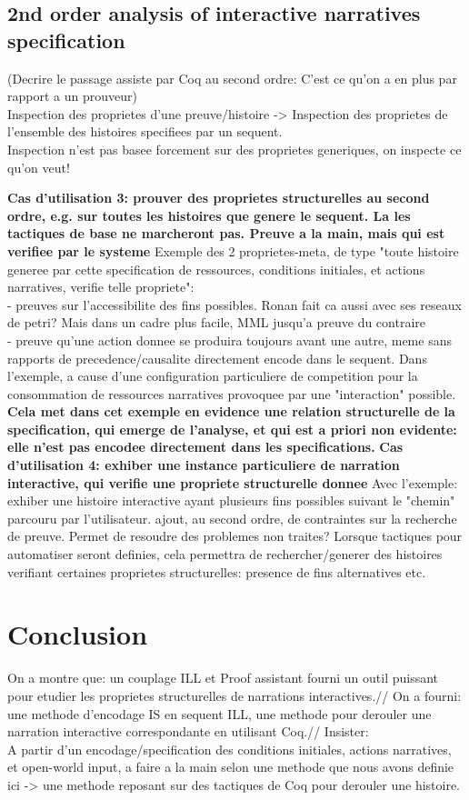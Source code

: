 \documentclass[runningheads,a4paper]{llncs}
\begin{document}
\subsection{2nd order analysis of interactive narratives specification}
(Decrire le passage assiste par Coq au second ordre: C'est ce qu'on a en plus par rapport a un prouveur)
\\
Inspection des proprietes d'une preuve/histoire -> Inspection des proprietes de l'ensemble des histoires specifiees par un sequent.\\
Inspection n'est pas basee forcement sur des proprietes generiques, on inspecte ce qu'on veut!

\textbf{Cas d'utilisation 3: prouver des proprietes structurelles au second ordre, e.g. sur toutes les histoires que genere le sequent. La les tactiques de base ne marcheront pas. Preuve a la main, mais qui est verifiee par le systeme}
Exemple des 2 proprietes-meta, de type "toute histoire generee par cette specification de ressources, conditions initiales, et actions narratives, verifie telle propriete":\\
- preuves sur l'accessibilite des fins possibles. Ronan fait ca aussi avec ses reseaux de petri? Mais dans un cadre plus facile, MML jusqu'a preuve du contraire\\
- preuve qu'une action donnee se produira toujours avant une autre, meme sans rapports de precedence/causalite directement encode dans le sequent. Dans l'exemple, a cause d'une configuration particuliere de competition pour la consommation de ressources narratives provoquee par une "interaction" possible. \textbf{Cela met dans cet exemple en evidence une relation structurelle de la specification, qui emerge de l'analyse, et qui est a priori non evidente: elle n'est pas encodee directement dans les specifications.}
\textbf{Cas d'utilisation 4: exhiber une instance particuliere de narration interactive, qui verifie une propriete structurelle donnee}
Avec l'exemple: exhiber une histoire interactive ayant plusieurs fins possibles suivant le "chemin" parcouru par l'utilisateur.
ajout, au second ordre, de contraintes sur la recherche de preuve. Permet de resoudre des problemes non traites?
Lorsque tactiques pour automatiser seront definies, cela permettra de rechercher/generer des histoires verifiant certaines proprietes structurelles: presence de fins alternatives etc.
\section{Conclusion}
On a montre que: un couplage ILL et Proof assistant fourni un outil puissant pour etudier les proprietes structurelles de narrations interactives.//
On a fourni: une methode d'encodage IS en sequent ILL, une methode pour derouler une narration interactive correspondante en utilisant Coq.//
Insister:\\
A partir d'un encodage/specification des conditions initiales, actions narratives, et open-world input, a faire a la main selon une methode que nous avons definie ici -> une methode reposant sur des tactiques de Coq pour derouler une histoire.
\end{document}
